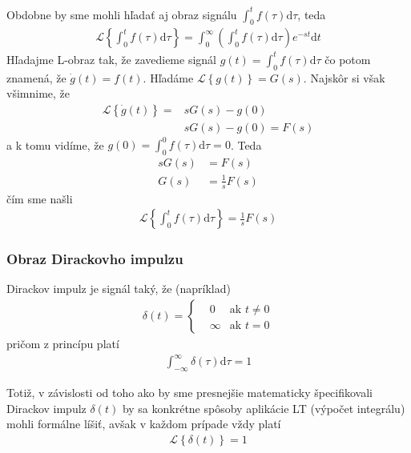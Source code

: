 \documentclass[a4paper, 10pt, ]{article}
\begin{document}
Obdobne by sme mohli hľadať aj obraz signálu $\int_0^t f(\tau) \text{d}\tau$, teda
\begin{align}
    \mathcal L \left\{ \int_0^t f(\tau) \text{d}\tau \right\} = \int_0^\infty \left(\int_0^t f(\tau) \text{d}\tau \right) e^{-st}\text{d}t
\end{align}
Hľadajme L-obraz tak, že zavedieme signál $g(t) = \int_0^t f(\tau) \text{d}\tau$ čo potom znamená, že $\dot g(t) = f(t)$. Hľadáme $\mathcal L \left\{ g(t) \right\} = G(s)$. Najskôr si však všimnime, že
\begin{equation}
    \begin{aligned}
        \mathcal L \left\{ \dot g(t) \right\} =& s G(s) - g(0) \\
        & s G(s) - g(0) = F(s)
    \end{aligned}
\end{equation}
a k tomu vidíme, že $g(0) = \int_0^0 f(\tau) \text{d}\tau = 0$. Teda
\begin{subequations}
    \begin{align}
        sG(s) &= F(s) \\
        G(s) &= \frac{1}{s} F(s)
    \end{align}
\end{subequations}
čím sme našli
\begin{align}
    \mathcal L \left\{ \int_0^t f(\tau) \text{d}\tau \right\} = \frac{1}{s} F(s)
\end{align}






\subsubsection{Obraz Dirackovho impulzu}

Dirackov impulz je signál taký, že (napríklad)
\begin{align}
    \delta(t) =
    \left\{
        \begin{aligned}
            &0 & \text{ak $t \neq 0$} \\
            &\infty & \text{ak $t = 0$}
        \end{aligned}
    \right.
\end{align}
pričom z princípu platí
\begin{align}
    \int_{-\infty}^\infty \delta(\tau) \text{d}\tau = 1
\end{align}

Totiž, v závislosti od toho ako by sme presnejšie matematicky špecifikovali Dirackov impulz $\delta(t)$ by sa konkrétne spôsoby aplikácie LT (výpočet integrálu) mohli formálne líšiť, avšak v každom prípade vždy platí
\begin{align}
    \mathcal L \left\{ \delta(t) \right\} = 1
\end{align}
\end{document}
